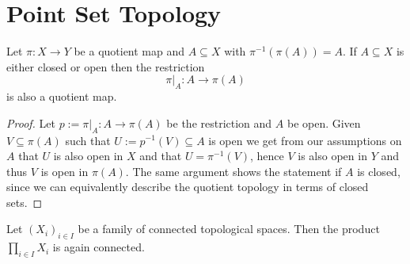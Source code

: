 \section{Point Set Topology}

\begin{lemma}
    Let $\pi \colon X \to Y$ be a quotient map and $A \subseteq X$ with $\pi^{-1}(\pi(A)) = A$. If $A \subseteq X$ is either closed or open then the restriction
    \[
    \pi|_A \colon A \to \pi(A)
    \]
    is also a quotient map.
\end{lemma}

\begin{proof}
    Let $p:= \pi|_{A} \colon A \to \pi(A)$ be the restriction and $A$ be open. Given $V \subseteq \pi(A)$ such that $U:=p^{-1}(V) \subseteq A$ is open we get from our assumptions on $A$ that $U$ is also open in $X$ and that $ U = \pi^{-1}(V)$, hence $V$ is also open in $Y$ and thus $V$ is open in $\pi(A)$. The same argument shows the statement if $A$ is closed, since we can equivalently describe the quotient topology in terms of closed sets.  
\end{proof}

\begin{lemma}
    Let $(X_i)_{i \in I}$ be a family of connected topological spaces. Then the product $\prod_{i \in I} X_i$ is again connected. 
\end{lemma}

